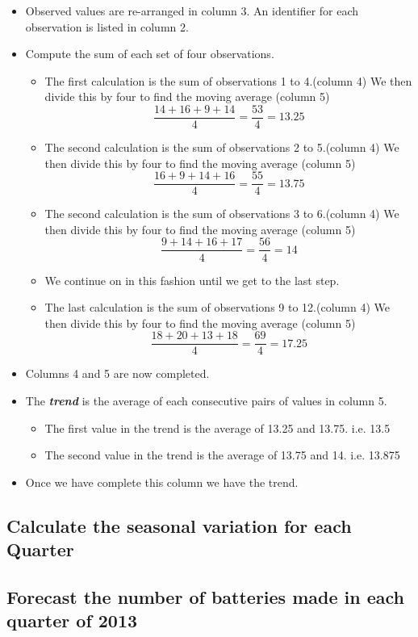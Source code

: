 \documentclass[a4paper,12pt]{article}
\begin{document}
\begin{itemize}
\item Observed values are re-arranged in column 3. An identifier for each observation is listed in column 2.
\item Compute the sum of each set of four observations.
\begin{itemize}
\item The first calculation is the sum of observations 1 to 4.(column 4) We then divide this by four to find the moving average (column 5)
\[\frac{14 + 16 + 9 + 14}{ 4} = \frac{53}{4} = 13.25 \]
\item The second calculation is the sum of observations 2 to 5.(column 4) We then divide this by four to find the moving average (column 5)
\[\frac{ 16 + 9 + 14 + 16}{ 4} = \frac{55}{4} = 13.75 \]
\item The second calculation is the sum of observations 3 to 6.(column 4) We then divide this by four to find the moving average (column 5)
\[\frac{9 + 14 + 16 + 17}{ 4} = \frac{56}{4} = 14 \]
\item We continue on in this fashion until we get to the last step.
\item The last calculation is the sum of observations 9 to 12.(column 4) We then divide this by four to find the moving average (column 5)
\[\frac{ 18 + 20 + 13 + 18}{ 4} = \frac{69}{4} = 17.25 \]
\end{itemize}
\item Columns 4 and 5 are now completed. 
\item The \textbf{\textit{trend}} is the average of each consecutive pairs of values in column 5. 
\begin{itemize}
\item The first value in the trend is the average of 13.25 and 13.75. i.e. 13.5
\item The second value in the trend is the average of 13.75 and 14. i.e. 13.875
\end{itemize}
\item Once we have complete this column we have the trend.
\end{itemize}
\subsection*{Calculate the seasonal variation for each Quarter}
\subsection*{Forecast the number of batteries made in each quarter of 2013}
\end{document}
